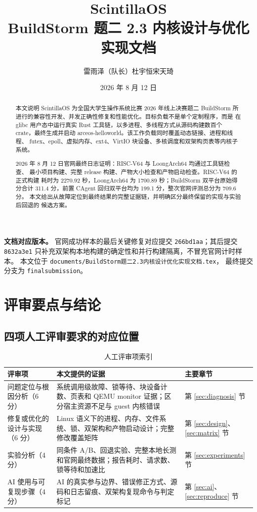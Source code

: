 \documentclass[UTF8,zihao=-4]{ctexart}
\title{\bfseries ScintillaOS\\[0.4em]
BuildStorm 题二 2.3 内核设计与优化实现文档}
\author{雷雨泽（队长）\quad 杜宇恒\quad 宋天琦}
\date{2026 年 8 月 12 日}
\newcommand{\code}{\nolinkurl}
\begin{document}
\maketitle
\thispagestyle{empty}

\begin{abstract}
本文说明 ScintillaOS 为全国大学生操作系统比赛 2026 年线上决赛题二 BuildStorm
所进行的兼容性开发、并发正确性修复和性能优化。目标负载不是单个定制程序，而是
在 glibc 用户态中运行真实 Rust 工具链，以多进程、多线程方式从源码构建数百个
crate，最终生成并启动 arceos-helloworld。该工作负载同时覆盖动态链接、进程和线程、
futex、epoll、虚拟内存、ext4、VirtIO 块设备、多核调度和双架构页表等内核子系统。

2026 年 8 月 12 日官网最终日志证明：RISC-V64 与 LoongArch64 均通过工具链检查、
最小项目构建、完整 release 构建、产物大小检查和产物启动检查。RISC-V64 的正式构建
耗时为 2270.92 秒，LoongArch64 为 1700.89 秒；BuildStorm 双平台原始得分合计
311.4 分，前置 CAgent 回归双平台均为 199.1 分，整次官网评测总分为 709.6 分。
本文给出从故障定位到最终结果的完整证据链，并明确区分最终保留的实现与实验后回退的
候选方案。
\end{abstract}

\vfill
\noindent\colorbox{ScintillaGray}{%
\parbox{0.96\textwidth}{
\textbf{文档对应版本。}
官网成功样本的最后关键修复对应提交 \code{266bd1aa}；其后提交
\code{8632a3e1} 只补充双架构本地构建的确定性和并行构建隔离，不冒充官网计时样本。
本文位于 \code{documents/BuildStorm题二2.3内核设计优化实现文档.tex}，
最终提交分支为 \code{finalsubmission}。
}}

\clearpage
\tableofcontents
\clearpage

\section{评审要点与结论}

\subsection{四项人工评审要求的对应位置}

\begin{table}[H]
\centering
\small
\begin{tabularx}{\textwidth}{p{}Yp{0.18\textwidth}}
\toprule
评审项 & 本文提供的证据 & 主要章节 \\
\midrule
问题定位与根因分析（6 分） & 系统调用级故障、锁等待、块设备计数、页表和 QEMU monitor 证据；区分宿主资源不足与 guest 内核错误 & 第 \ref{sec:diagnosis} 节 \\
修复或优化的设计与实现（6 分） & Linux 语义下的进程、内存、文件系统、锁、双架构和产物启动设计；完整修改覆盖矩阵 & 第 \ref{sec:design}、\ref{sec:matrix} 节 \\
实验分析（4 分） & 同条件 A/B、回退实验、完整本地长测和官网最终数据；报告耗时、请求数、锁等待和加速比 & 第 \ref{sec:experiments} 节 \\
AI 使用与可复现步骤（4 分） & AI 的真实参与边界、错误修正方式、源码和日志留痕、双架构复现命令与判定标记 & 第 \ref{sec:ai}、\ref{sec:reproduce} 节 \\
\bottomrule
\end{tabularx}
\caption{人工评审项索引}
\end{table}
\end{document}
